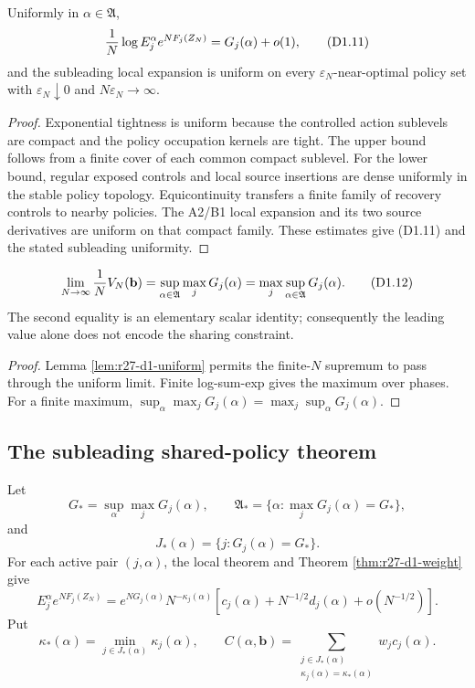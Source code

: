 \begin{lemma}
\label{lem:r27-d1-uniform}
Uniformly in $\alpha\in\mathfrak A$,
\[
 {1\over N}\log E_j^\alpha e^{NF_j(Z_N)}
 =G_j(\alpha)+o(1),                                      \tag{D1.11}
\]
and the subleading local expansion is uniform on every
$\varepsilon_N$-near-optimal policy set with
$\varepsilon_N\downarrow0$ and $N\varepsilon_N\to\infty$.
\end{lemma}

\begin{proof}
Exponential tightness is uniform because the controlled action sublevels are
compact and the policy occupation kernels are tight.  The upper bound follows
from a finite cover of each common compact sublevel.  For the lower bound,
regular exposed controls and local source insertions are dense uniformly in
the stable policy topology.  Equicontinuity transfers a finite family of
recovery controls to nearby policies.  The A2/B1 local expansion and its two
source derivatives are uniform on that compact family.  These estimates give
(D1.11) and the stated subleading uniformity.
\end{proof}

\begin{theorem}
\label{thm:r27-d1-leading}
\[
 \lim_{N\to\infty}{1\over N}V_N(\mathbf b)
 =\sup_{\alpha\in\mathfrak A}\max_jG_j(\alpha)
 =\max_j\sup_{\alpha\in\mathfrak A}G_j(\alpha).            \tag{D1.12}
\]
The second equality is an elementary scalar identity; consequently the
leading value alone does not encode the sharing constraint.
\end{theorem}

\begin{proof}
Lemma \ref{lem:r27-d1-uniform} permits the finite-$N$ supremum to pass through
the uniform limit.  Finite log-sum-exp gives the maximum over phases.  For a
finite maximum,
$\sup_\alpha\max_jG_j(\alpha)=\max_j\sup_\alpha G_j(\alpha)$.
\end{proof}

\subsection{The subleading shared-policy theorem}

Let
\[
 G_*=\sup_\alpha\max_jG_j(\alpha),\qquad
 \mathfrak A_*=\{\alpha:\max_jG_j(\alpha)=G_*\},
\]
and
\[
 J_*(\alpha)=\{j:G_j(\alpha)=G_*\}.
\]
For each active pair $(j,\alpha)$, the local theorem and
Theorem \ref{thm:r27-d1-weight} give
\[
 E_j^\alpha e^{NF_j(Z_N)}
 =e^{NG_j(\alpha)}N^{-\kappa_j(\alpha)}
 \left[c_j(\alpha)+N^{-1/2}d_j(\alpha)+o(N^{-1/2})\right].              \tag{D1.13}
\]
Put
\[
 \kappa_*(\alpha)=\min_{j\in J_*(\alpha)}\kappa_j(\alpha),
 \qquad
 C(\alpha,\mathbf b)
 =\sum_{\substack{j\in J_*(\alpha)\\
                   \kappa_j(\alpha)=\kappa_*(\alpha)}}
 w_jc_j(\alpha).                                          \tag{D1.14}
\]


